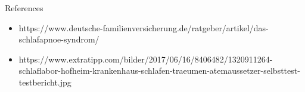 \documentclass[18pt]{beamer}
\begin{document}
\appendix
\beginbackup

\begin{frame}[allowframebreaks]{References}
\begin{itemize}
	\item https://www.deutsche-familienversicherung.de/ratgeber/artikel/das-schlafapnoe-syndrom/
	\item https://www.extratipp.com/bilder/2017/06/16/8406482/1320911264-schlaflabor-hofheim-krankenhaus-schlafen-traeumen-atemaussetzer-selbsttest-testbericht.jpg
\end{itemize}
\printbibliography
\end{frame}

\backupend
\end{document}
